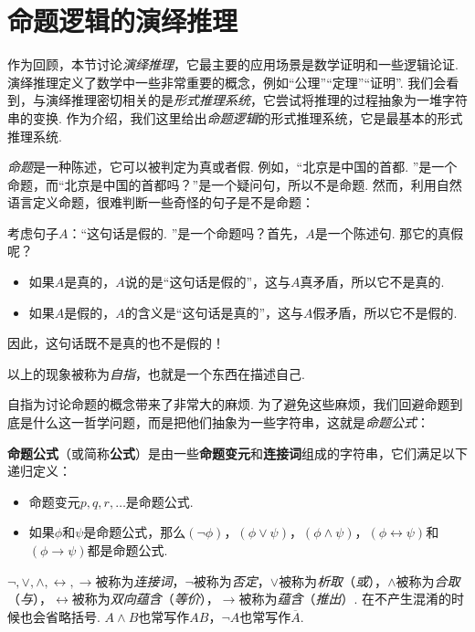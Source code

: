\section{命题逻辑的演绎推理}

作为回顾，本节讨论\emph{演绎推理}，它最主要的应用场景是数学证明和一些逻辑论证. 演绎推理定义了数学中一些非常重要的概念，例如“公理”“定理”“证明”. 我们会看到，与演绎推理密切相关的是\emph{形式推理系统}，它尝试将推理的过程抽象为一堆字符串的变换. 作为介绍，我们这里给出\emph{命题逻辑}的形式推理系统，它是最基本的形式推理系统. 

\emph{命题}是一种陈述，它可以被判定为真或者假. 例如，“北京是中国的首都. ”是一个命题，而“北京是中国的首都吗？”是一个疑问句，所以不是命题. 然而，利用自然语言定义命题，很难判断一些奇怪的句子是不是命题：

\begin{example}
考虑句子$A$：“这句话是假的. ”是一个命题吗？首先，$A$是一个陈述句. 那它的真假呢？
\begin{itemize}
    \item 如果$A$是真的，$A$说的是“这句话是假的”，这与$A$真矛盾，所以它不是真的. 
    \item 如果$A$是假的，$A$的含义是“这句话是真的”，这与$A$假矛盾，所以它不是假的. 
\end{itemize}
因此，这句话既不是真的也不是假的！
\end{example}

以上的现象被称为\emph{自指}，也就是一个东西在描述自己.

自指为讨论命题的概念带来了非常大的麻烦. 为了避免这些麻烦，我们回避命题到底是什么这一哲学问题，而是把他们抽象为一些字符串，这就是\emph{命题公式}：

\begin{definition}[命题公式]
\textbf{命题公式}（或简称\textbf{公式}）是由一些\textbf{命题变元}和\textbf{连接词}组成的字符串，它们满足以下递归定义：
\begin{itemize}
    \item 命题变元$p,q,r,\dots$是命题公式. 
    \item 如果$\phi$和$\psi$是命题公式，那么$(\neg\phi)$，$(\phi\vee\psi)$，$(\phi\wedge\psi)$，$(\phi\leftrightarrow\psi)$和$(\phi\to\psi)$都是命题公式. 
\end{itemize}

$\neg,\vee,\wedge,\leftrightarrow,\to$被称为\emph{连接词}，$\neg$被称为\emph{否定}，$\vee$被称为\emph{析取}（\emph{或}），$\wedge$被称为\emph{合取}（\emph{与}），$\leftrightarrow$被称为\emph{双向蕴含}（\emph{等价}），$\to$被称为\emph{蕴含}（\emph{推出}）. 在不产生混淆的时候也会省略括号. $A\wedge B$也常写作$AB$，$\neg A$也常写作$\overline{A}$.
\end{definition}

